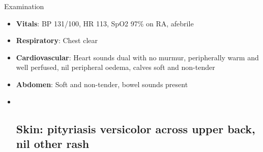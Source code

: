 \documentclass[
  ignorenonframetext,
]{beamer}
\begin{document}
\begin{frame}{Examination}
\protect\hypertarget{examination}{}
\begin{itemize}
\item
  \textbf{Vitals}: BP 131/100, HR 113, SpO2 97\% on RA, afebrile
\item
  \textbf{Respiratory}: Chest clear
\item
  \textbf{Cardiovascular}: Heart sounds dual with no murmur,
  peripherally warm and well perfused, nil peripheral oedema, calves
  soft and non-tender
\item
  \textbf{Abdomen}: Soft and non-tender, bowel sounds present
\item ~
  \hypertarget{skin-pityriasis-versicolor-across-upper-back-nil-other-rash}{%
  \subsection{\texorpdfstring{\textbf{Skin}: pityriasis versicolor
  across upper back, nil other
  rash}{Skin: pityriasis versicolor across upper back, nil other rash}}\label{skin-pityriasis-versicolor-across-upper-back-nil-other-rash}}
\end{itemize}
\end{frame}
\end{document}
